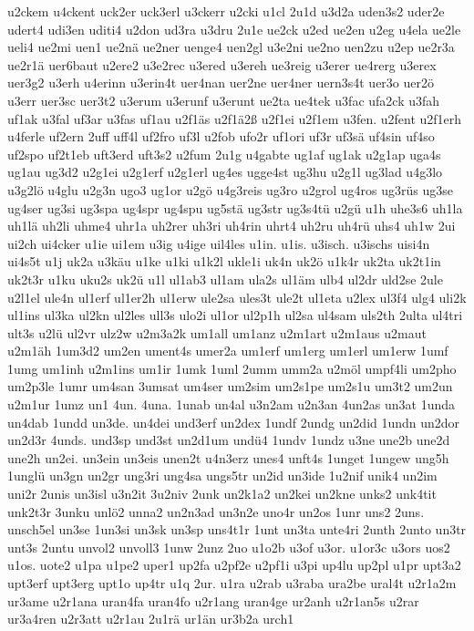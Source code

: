 {u2ckem
u4ckent
uck2er
uck3erl
u3ckerr
u2cki
u1cl
2u1d
u3d2a
uden3s2
uder2e
udert4
udi3en
uditi4
u2don
ud3ra
u3dru
2u1e
ue2ck
u2ed
ue2en
u2eg
u4ela
ue2le
ueli4
ue2mi
uen1
ue2nä
ue2ner
uenge4
uen2gl
u3e2ni
ue2no
uen2zu
u2ep
ue2r3a
ue2r1ä
uer6baut
u2ere2
u3e2rec
u3ered
u3ereh
ue3reig
u3erer
ue4rerg
u3erex
uer3g2
u3erh
u4erinn
u3erin4t
uer4nan
uer2ne
uer4ner
uern3s4t
uer3o
uer2ö
u3err
uer3sc
uer3t2
u3erum
u3erunf
u3erunt
ue2ta
ue4tek
u3fac
ufa2ck
u3fah
uf1ak
u3fal
uf3ar
u3fas
uf1au
u2f1äs
u2f1ä2ß
u2f1ei
u2f1em
u3fen.
u2fent
u2f1erh
u4ferle
uf2ern
2uff
uff4l
uf2fro
uf3l
u2fob
ufo2r
uf1ori
uf3r
uf3sä
uf4sin
uf4so
uf2spo
uf2t1eb
uft3erd
uft3s2
u2fum
2u1g
u4gabte
ug1af
ug1ak
u2g1ap
uga4s
ug1au
ug3d2
u2g1ei
u2g1erf
u2g1erl
ug4es
ugge4st
ug3hu
u2g1l
ug3lad
u4g3lo
u3g2lö
u4glu
u2g3n
ugo3
ug1or
u2gö
u4g3reis
ug3ro
u2grol
ug4ros
ug3rüs
ug3se
ug4ser
ug3si
ug3spa
ug4spr
ug4spu
ug5stä
ug3str
ug3s4tü
u2gü
u1h
uhe3s6
uh1la
uh1lä
uh2li
uhme4
uhr1a
uh2rer
uh3ri
uh4rin
uhrt4
uh2ru
uh4rü
uhs4
uh1w
2ui
ui2ch
ui4cker
u1ie
ui1em
u3ig
u4ige
uil4les
u1in.
u1is.
u3isch.
u3ischs
uisi4n
ui4s5t
u1j
uk2a
u3käu
u1ke
u1ki
u1k2l
ukle1i
uk4n
uk2ö
u1k4r
uk2ta
uk2t1in
uk2t3r
u1ku
uku2s
uk2ü
u1l
ul1ab3
ul1am
ula2s
ul1äm
ulb4
ul2dr
uld2se
2ule
u2l1el
ule4n
ul1erf
ul1er2h
ul1erw
ule2sa
ules3t
ule2t
ul1eta
u2lex
ul3f4
ulg4
uli2k
ul1ins
ul3ka
ul2kn
ul2les
ull3s
ulo2i
ul1or
ul2p1h
ul2sa
ul4sam
uls2th
2ulta
ul4tri
ult3s
u2lü
ul2vr
ulz2w
u2m3a2k
um1all
um1anz
u2m1art
u2m1aus
u2maut
u2m1äh
1um3d2
um2en
ument4s
umer2a
um1erf
um1erg
um1erl
um1erw
1umf
1umg
um1inh
u2m1ins
um1ir
1umk
1uml
2umm
umm2a
u2möl
umpf4li
um2pho
um2p3le
1umr
um4san
3umsat
um4ser
um2sim
um2s1pe
um2s1u
um3t2
um2un
u2m1ur
1umz
un1
4un.
4una.
1unab
un4al
u3n2am
u2n3an
4un2as
un3at
1unda
un4dab
1undd
un3de.
un4dei
und3erf
un2dex
1undf
2undg
un2did
1undn
un2dor
un2d3r
4unds.
und3sp
und3st
un2d1um
undü4
1undv
1undz
u3ne
une2b
une2d
une2h
un2ei.
un3ein
un3eis
unen2t
u4n3erz
unes4
unft4s
1unget
1ungew
ung5h
1unglü
un3gn
un2gr
ung3ri
ung4sa
ungs5tr
un2id
un3ide
1u2nif
unik4
un2im
uni2r
2unis
un3isl
u3n2it
3u2niv
2unk
un2k1a2
un2kei
un2kne
unks2
unk4tit
unk2t3r
3unku
unlö2
unna2
un2n3ad
un3n2e
uno4r
un2os
1unr
uns2
2uns.
unsch5el
un3se
1un3si
un3sk
un3sp
uns4t1r
1unt
un3ta
unte4ri
2unth
2unto
un3tr
unt3s
2untu
unvol2
unvoll3
1unw
2unz
2uo
u1o2b
u3of
u3or.
u1or3c
u3ors
uos2
u1os.
uote2
u1pa
u1pe2
uper1
up2fa
u2pf2e
u2pf1i
u3pi
up4lu
up2pl
u1pr
upt3a2
upt3erf
upt3erg
upt1o
up4tr
u1q
2ur.
u1ra
u2rab
u3raba
ura2be
ural4t
u2r1a2m
ur3ame
u2r1ana
uran4fa
uran4fo
u2r1ang
uran4ge
ur2anh
u2r1an5s
u2rar
ur3a4ren
u2r3att
u2r1au
2u1rä
ur1än
ur3b2a
urch1
}
